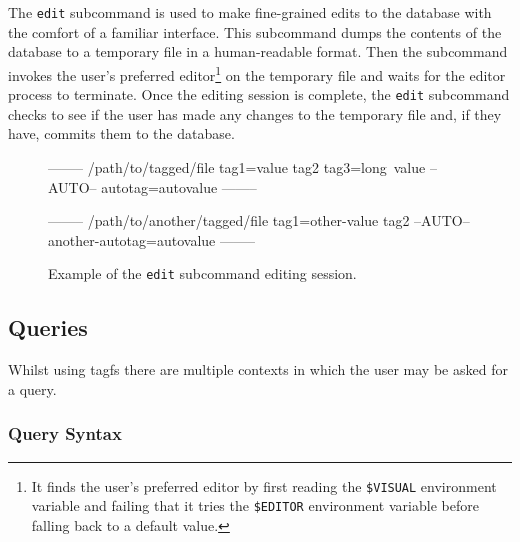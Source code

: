 The \texttt{edit} subcommand is used to make fine-grained edits to the database
with the comfort of a familiar interface. This subcommand dumps the contents of
the database to a temporary file in a human-readable format. Then the
subcommand invokes the user's preferred editor\footnote{It finds the user's
preferred editor by first reading the \texttt{\$VISUAL} environment variable and
failing that it tries the \texttt{\$EDITOR} environment variable before falling
back to a default value.} on the temporary file and waits for the editor
process to terminate. Once the editing session is complete, the \texttt{edit}
subcommand checks to see if the user has made any changes to the temporary
file and, if they have, commits them to the database.  

\begin{figure}[h]
    \centering
    \begin{boxedverbatim}


--------
/path/to/tagged/file
tag1=value
tag2
tag3=long\ value
--AUTO--
autotag=autovalue
--------

--------
/path/to/another/tagged/file
tag1=other-value
tag2
--AUTO--
another-autotag=autovalue
--------
    \end{boxedverbatim}
    \label{fig:edit-subcommand-format}
    \caption{Example of the \texttt{edit} subcommand editing session.}
\end{figure}

\subsection{Queries}
\label{sec:queries}

Whilst using tagfs there are multiple contexts in which the user may be asked
for a query.

\subsubsection{Query Syntax}
\label{sec:query-syntax}



